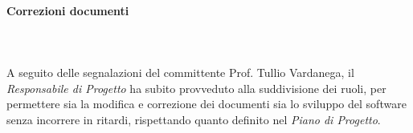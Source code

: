 \paragraph{Correzioni documenti}\mbox{} \\ \mbox{} \\
A seguito delle segnalazioni del committente Prof. Tullio Vardanega, il \textit{Responsabile di Progetto} ha subito provveduto alla suddivisione dei ruoli, per permettere sia la modifica e correzione dei documenti sia lo sviluppo del software senza incorrere in ritardi, rispettando quanto definito nel \textit{Piano di Progetto}.